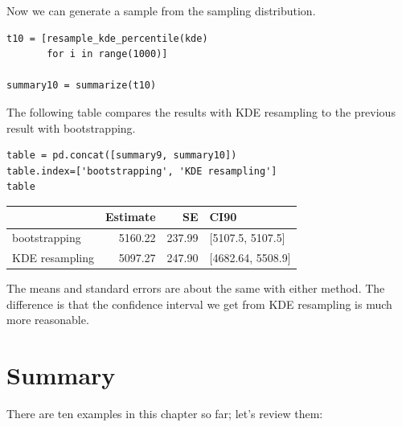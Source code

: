 Now we can generate a sample from the sampling distribution.

\begin{lstlisting}[]
t10 = [resample_kde_percentile(kde)
       for i in range(1000)]

summary10 = summarize(t10)
\end{lstlisting}

The following table compares the results with KDE resampling to the
previous result with bootstrapping.

\begin{lstlisting}[]
table = pd.concat([summary9, summary10])
table.index=['bootstrapping', 'KDE resampling']
table
\end{lstlisting}

\begin{tabular}{lrrl}
\midrule
{} &  Estimate &      SE &               CI90 \\
\midrule
bootstrapping  &   5160.22 &  237.99 &   [5107.5, 5107.5] \\
KDE resampling &   5097.27 &  247.90 &  [4682.64, 5508.9] \\
\midrule
\end{tabular}

The means and standard errors are about the same with either method. The
difference is that the confidence interval we get from KDE resampling is
much more reasonable.

\hypertarget{summary}{%
\section{Summary}\label{summary}}

There are ten examples in this chapter so far; let's review them:

